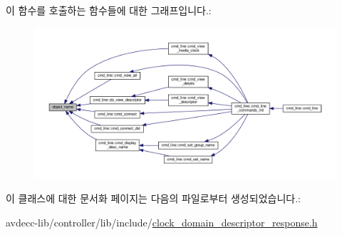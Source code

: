 이 함수를 호출하는 함수들에 대한 그래프입니다.\+:
\nopagebreak
\begin{figure}[H]
\begin{center}
\leavevmode
\includegraphics[width=350pt]{classavdecc__lib_1_1descriptor__response__base_a133f7774946d80f82b8aaaa4cfbb7361_icgraph}
\end{center}
\end{figure}




이 클래스에 대한 문서화 페이지는 다음의 파일로부터 생성되었습니다.\+:\begin{DoxyCompactItemize}
\item 
avdecc-\/lib/controller/lib/include/\hyperlink{clock__domain__descriptor__response_8h}{clock\+\_\+domain\+\_\+descriptor\+\_\+response.\+h}\end{DoxyCompactItemize}
